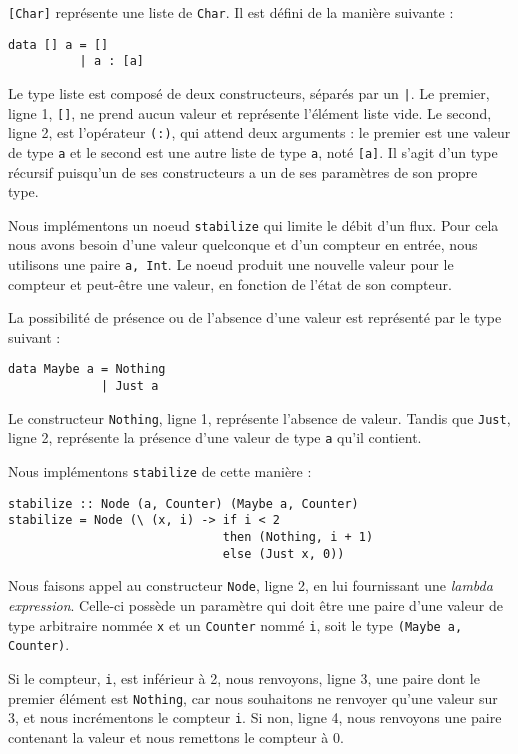 \documentclass{llncs}
\begin{document}
\lstinline{[Char]} représente une liste de \lstinline{Char}.
Il est défini de la manière suivante :
\begin{lstlisting}
data [] a = []
          | a : [a]
\end{lstlisting}

Le type liste est composé de deux constructeurs, séparés par un \lstinline{|}.
Le premier, ligne 1, \lstinline{[]}, ne prend aucun valeur et représente l'élément
liste vide.
Le second, ligne 2, est l'opérateur \lstinline{(:)}, qui attend deux arguments :
le premier est une valeur de type \lstinline{a} et le second est une autre liste de
type \lstinline{a}, noté \lstinline{[a]}.
Il s'agit d'un type récursif puisqu'un de ses constructeurs a un de ses paramètres
de son propre type.

Nous implémentons un noeud \lstinline{stabilize} qui limite le débit d'un flux.
Pour cela nous avons besoin d'une valeur quelconque et d'un compteur en entrée,
nous utilisons une paire \lstinline{a, Int}.
Le noeud produit une nouvelle valeur pour le compteur et peut-être une valeur,
en fonction de l'état de son compteur.

La possibilité de présence ou de l'absence d'une valeur est représenté par le type
suivant :

\begin{lstlisting}
data Maybe a = Nothing
             | Just a
\end{lstlisting}

Le constructeur \lstinline{Nothing}, ligne 1, représente l'absence de valeur.
Tandis que \lstinline{Just}, ligne 2, représente la présence d'une valeur de type
\lstinline{a} qu'il contient.

Nous implémentons \lstinline{stabilize} de cette manière :
\begin{lstlisting}
stabilize :: Node (a, Counter) (Maybe a, Counter)
stabilize = Node (\ (x, i) -> if i < 2
                              then (Nothing, i + 1)
                              else (Just x, 0))
\end{lstlisting}

Nous faisons appel au constructeur \lstinline{Node}, ligne 2, en lui fournissant
une \emph{lambda expression}.
Celle-ci possède un paramètre qui doit être une paire d'une valeur de type arbitraire
nommée \lstinline{x} et un \lstinline{Counter} nommé \lstinline{i}, soit le type
\lstinline{(Maybe a, Counter)}.

Si le compteur, \lstinline{i}, est inférieur à 2, nous renvoyons, ligne 3,
une paire dont le premier élément est \lstinline{Nothing}, car nous souhaitons
ne renvoyer qu'une valeur sur 3, et nous incrémentons le compteur \lstinline{i}.
Si non, ligne 4, nous renvoyons une paire contenant la valeur et nous remettons
le compteur à 0.
\end{document}
